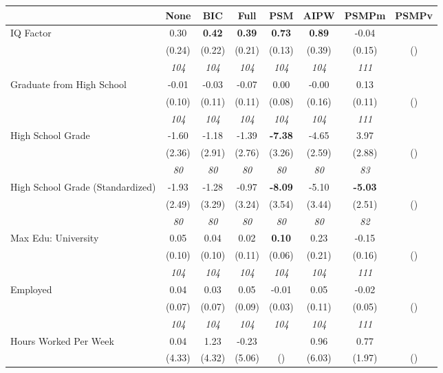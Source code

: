 \begin{tabular}{l c c c c c c c}
\toprule
 & None & BIC & Full & PSM & AIPW & PSMPm & PSMPv \\
\midrule
IQ Factor & 0.30 & \textbf{ 0.42 } & \textbf{ 0.39 } & \textbf{0.73} & \textbf{0.89} & -0.04 & \\
& (0.24) & (0.22) & (0.21) & (0.13) & (0.39) & (0.15) & () \\
& \textit{ 104 } & \textit{ 104 } & \textit{ 104 } & \textit{ 104 } & \textit{ 104 } & \textit{ 111 } & \\
Graduate from High School & -0.01 & -0.03 & -0.07 & 0.00 & -0.00 & 0.13 & \\
& (0.10) & (0.11) & (0.11) & (0.08) & (0.16) & (0.11) & () \\
& \textit{ 104 } & \textit{ 104 } & \textit{ 104 } & \textit{ 104 } & \textit{ 104 } & \textit{ 111 } & \\
High School Grade & -1.60 & -1.18 & -1.39 & \textbf{-7.38} & -4.65 & 3.97 & \\
& (2.36) & (2.91) & (2.76) & (3.26) & (2.59) & (2.88) & () \\
& \textit{ 80 } & \textit{ 80 } & \textit{ 80 } & \textit{ 80 } & \textit{ 80 } & \textit{ 83 } & \\
High School Grade (Standardized) & -1.93 & -1.28 & -0.97 & \textbf{-8.09} & -5.10 & \textbf{-5.03} & \\
& (2.49) & (3.29) & (3.24) & (3.54) & (3.44) & (2.51) & () \\
& \textit{ 80 } & \textit{ 80 } & \textit{ 80 } & \textit{ 80 } & \textit{ 80 } & \textit{ 82 } & \\
Max Edu: University & 0.05 & 0.04 & 0.02 & \textbf{0.10} & 0.23 & -0.15 & \\
& (0.10) & (0.10) & (0.11) & (0.06) & (0.21) & (0.16) & () \\
& \textit{ 104 } & \textit{ 104 } & \textit{ 104 } & \textit{ 104 } & \textit{ 104 } & \textit{ 111 } & \\
Employed & 0.04 & 0.03 & 0.05 & -0.01 & 0.05 & -0.02 & \\
& (0.07) & (0.07) & (0.09) & (0.03) & (0.11) & (0.05) & () \\
& \textit{ 104 } & \textit{ 104 } & \textit{ 104 } & \textit{ 104 } & \textit{ 104 } & \textit{ 111 } & \\
Hours Worked Per Week & 0.04 & 1.23 & -0.23 & & 0.96 & 0.77 & \\
& (4.33) & (4.32) & (5.06) & () & (6.03) & (1.97) & () \\

\end{tabular}
